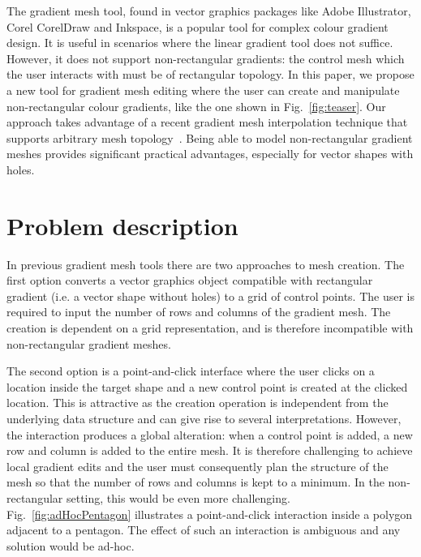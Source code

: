 \documentclass{egpubl}
\newcommand{\note}[3]{{\color{#2}\textbf{#1: #3}}}
\newcommand{\john}[1]{\note{JohnKa}{RubineRed}{#1}}
\begin{document}
	The gradient mesh tool, found in vector graphics packages like Adobe Illustrator, Corel CorelDraw and Inkspace, is a popular tool for complex colour gradient design. It is useful in scenarios where the linear gradient tool does not suffice. However, it does not support non-rectangular gradients: the control mesh which the user interacts with must be of rectangular topology. In this paper, we propose a new tool for gradient mesh editing where the user can create and manipulate non-rectangular colour gradients, like the one shown in Fig.~\ref{fig:teaser}. Our approach takes advantage of a recent gradient mesh interpolation technique that supports arbitrary mesh topology~\cite{Lieng:2016}. Being able to model non-rectangular gradient meshes provides significant practical advantages, especially for vector shapes with holes.
	
	
	\section{Problem description}
	\label{sec:overview}
	
	In previous gradient mesh tools there are two approaches to mesh creation. The first option converts a vector graphics object compatible with rectangular gradient (i.e. a vector shape without holes) to a grid of control points. The user is required to input the number of rows and columns of the gradient mesh. The creation is dependent on a grid representation, and is therefore incompatible with non-rectangular gradient meshes.
	
	The second option is a point-and-click interface where the user clicks on a location inside the target shape and a new control point is created at the clicked location. This is attractive as the creation operation is independent from the underlying data structure and can give rise to several interpretations. However, the interaction produces a global alteration: when a control point is added, a new row and column is added to the entire mesh. It is therefore challenging to achieve local gradient edits and the user must consequently plan the structure of the mesh so that the number of rows and columns is kept to a minimum. In the non-rectangular setting, this would be even more challenging. Fig.~\ref{fig:adHocPentagon} illustrates a point-and-click interaction inside a polygon adjacent to a pentagon. The effect of such an interaction is ambiguous and any solution would be ad-hoc.
	
\end{document}
